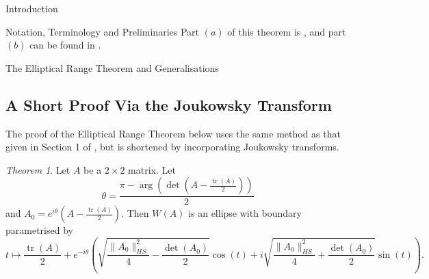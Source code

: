 \documentclass[12pt]{article}
\theoremstyle{plain}
\theoremstyle{definition}
\theoremstyle{remark}
\newtheorem{Theorem}{Theorem}[section]
\numberwithin{equation}{section}
\begin{document}
\begin{section}{Introduction}
\begin{subsection}{Notation, Terminology and Preliminaries}
Part $(a)$ of this theorem is \cite[Thm 2.2.8]{johnson1985matrix}, and part $(b)$ can be found in \cite{djokovic2007unitarily}.



\end{subsection}
\end{section}

\begin{section}{The Elliptical Range Theorem and Generalisations}\label{S2}
\subsection{A Short Proof Via the Joukowsky Transform}\label{2.1n}

The proof of the Elliptical Range Theorem below uses the same method as that given in Section 1 of \cite{hornjohnson}, but is shortened by incorporating Joukowsky transforms.

\begin{Theorem}\label{2ndproof}
    Let $A$ be a $ 2 \times 2$ matrix. Let $$
    \theta = \frac{\pi - \operatorname{arg}(\det (A - \frac{\operatorname{tr}(A)}{2}))}{2} 
    $$
    and $A_0 = e^{i \theta}(A - \frac{\operatorname{tr}(A)}{2})$. Then $W(A)$ is an ellipse with boundary parametrised by 
$$
t \mapsto \frac{\operatorname{tr}(A)}{2} +  e^{-i\theta}\left(\sqrt{\frac{\|A_0\|_{HS}^2}{4} - \frac{\det(A_0)}{2}} \cos(t) + i \sqrt{\frac{\|A_0\|_{HS}^2}{4} + \frac{\det(A_0)}{2}} \sin(t)\right).
$$ 
\end{Theorem}



\end{section}
\end{document}
